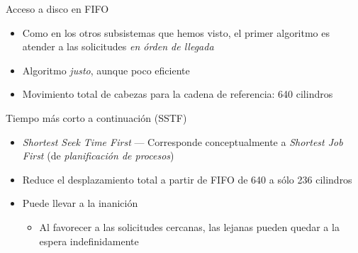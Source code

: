 \documentclass[presentation]{beamer}
\newcommand{\rarrow}{$\rightarrow$\hskip 0.5em}
\begin{document}
\begin{frame}[label={sec:org82c3fe0}]{Acceso a disco en FIFO}
\begin{itemize}
\item Como en los otros subsistemas que hemos visto, el primer algoritmo
es atender a las solicitudes \emph{en órden de llegada}
\item Algoritmo \emph{justo}, aunque poco eficiente
\item Movimiento total de cabezas para la cadena de referencia: 640
cilindros
\end{itemize}
\end{frame}

\begin{frame}[label={sec:org327f465}]{Tiempo más corto a continuación (SSTF)}
\begin{itemize}
\item \emph{Shortest Seek Time First} — Corresponde conceptualmente a \emph{Shortest
Job First} (de \emph{planificación de procesos})
\item Reduce el desplazamiento total a partir de FIFO de 640 a sólo 236 cilindros
\item Puede llevar a la inanición
\begin{itemize}
\item Al favorecer a las solicitudes cercanas, las lejanas pueden quedar
a la espera indefinidamente
\end{itemize}
\end{itemize}
\end{frame}
\end{document}
